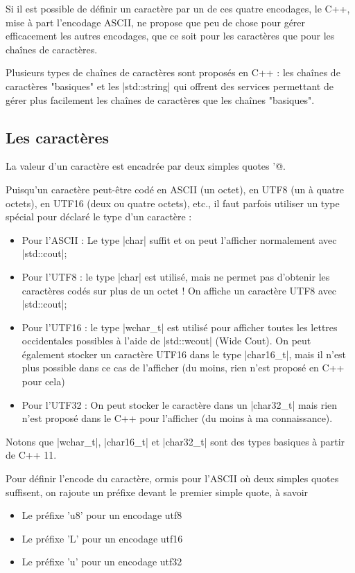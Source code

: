 Si il est possible de définir un caractère par un de ces quatre encodages, le C++, mise à part l'encodage ASCII, ne propose que peu de chose pour gérer efficacement les autres encodages, que ce soit pour les caractères que pour les chaînes de caractères.

Plusieurs types de chaînes de caractères sont proposés en C++ : les chaînes de caractères "basiques" et les |std::string|
qui offrent des services permettant de gérer plus facilement les chaînes de caractères que les chaînes "basiques".

\subsection{Les caractères}

La valeur d'un caractère est encadrée par deux simples quotes \verb@'@. 

Puisqu'un caractère peut-être codé en ASCII (un octet), en UTF8 (un à quatre octets), en UTF16 (deux ou quatre octets), etc., il faut parfois utiliser un type spécial pour déclaré le type d'un caractère :
\begin{itemize}
  \item Pour l'ASCII : Le type |char| suffit et on peut l'afficher normalement avec |std::cout|;
  \item Pour l'UTF8  : le type |char| est utilisé, mais ne permet pas d'obtenir les caractères codés sur plus de un octet ! On affiche un caractère UTF8 avec |std::cout|;
  \item Pour l'UTF16 : le type |wchar_t| est utilisé pour afficher toutes les lettres occidentales possibles à l'aide de |std::wcout| (Wide Cout). On peut également stocker un caractère UTF16 dans le type |char16_t|, mais il n'est plus possible dans ce cas de l'afficher (du moins, rien n'est proposé en C++ pour cela)
  \item Pour l'UTF32 : On peut stocker le caractère dans un |char32_t| mais rien n'est proposé dans le C++ pour l'afficher (du moins à ma connaissance).
\end{itemize}

Notons que |wchar_t|, |char16_t| et |char32_t| sont des types basiques à partir de C++ 11.

Pour définir l'encode du caractère, ormis pour l'ASCII où deux simples quotes suffisent, on rajoute un préfixe
devant le premier simple quote, à savoir
\begin{itemize}
  \item Le préfixe 'u8' pour un encodage utf8
  \item Le préfixe 'L'  pour un encodage utf16
  \item Le préfixe 'u'  pour un encodage utf32
\end{itemize}

